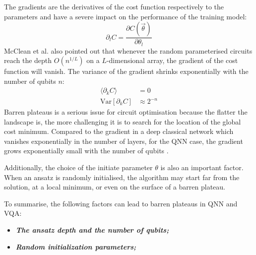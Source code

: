 The gradients are the derivatives of the cost function respectively to the parameters and have a severe impact on the performance of the training model:
\begin{equation}
    \partial_l C = \frac{\partial C(\vec{\theta})}{\partial\theta_l}
\end{equation}
McClean et al. \cite{mccleanBarrenPlateausQuantum2018} also pointed out that whenever the random parameterised circuits reach the depth $O(n^{1/L})$ on a $L$-dimensional array, the gradient of the cost function will vanish.
The variance of the gradient shrinks exponentially with the number of qubits $n$:
\begin{align}
    \langle \partial_k C\rangle & = 0  \label{Vanish Gradient}                  \\
    \mathrm{Var}[\partial_k C]  & \approx 2^{-n}  \label{Variance expo smaller}
\end{align}
Barren plateaus is a serious issue for circuit optimisation because the flatter the landscape is, the more challenging it is to search for the location of the global cost minimum.
Compared to the gradient in a deep classical network which vanishes exponentially in the number of layers, for the QNN case, the gradient grows exponentially small with the number of qubits \cite{mccleanBarrenPlateausQuantum2018}.

Additionally, the choice of the initiate parameter $\theta$ is also an important factor. When an ansatz is randomly initialised, the algorithm may start far from the solution, at a local minimum, or even on the surface of a barren plateau.

To summarise, the following factors can lead to barren plateaus in QNN and VQA:
\begin{itemize}
    \item \textbf{\emph{The ansatz depth and the number of qubits;}}
    \item \textbf{\emph{Random initialization parameters;}}
\end{itemize}

